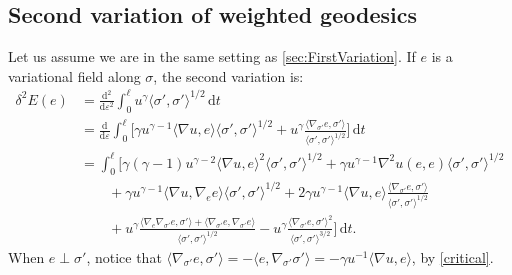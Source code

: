 \documentclass[12pt,a4paper,reqno]{amsart}
\theoremstyle{definition}
\newcommand{\D}{\nabla}
\newcommand{\metric}[2]{\langle#1,#2\rangle}
\renewcommand{\epsilon}{\varepsilon}
\begin{document}
\subsection{Second variation of weighted geodesics}\label{sec:Secondvariation}
  Let us assume we are in the same setting as \cref{sec:FirstVariation}. If $e$ is a variational field along $\sigma$, the second variation is:
\begin{equation}\label{eqn:OriginalSecondVariation}
\begin{aligned}
    \delta^2E(e) &= \frac{\mathrm{d}^2}{\mathrm{d}\epsilon^2}\int_0^\ell u^\gamma\metric{\sigma'}{\sigma'}^{1/2}\,\mathrm{d}t \\
    &= \frac {\mathrm{d}}{\mathrm{d}\epsilon}\int_0^\ell\Big[\gamma u^{\gamma-1}\metric{\D u}{e}\metric{\sigma'}{\sigma'}^{1/2}+u^\gamma\frac{\metric{\nabla_{\sigma'}e}{\sigma'}}{\metric{\sigma'}{\sigma'}^{1/2}}\Big]\,\mathrm{d}t \\
    &= \int_0^\ell\Big[\gamma(\gamma-1)u^{\gamma-2}\metric{\D u}{e}^2\metric{\sigma'}{\sigma'}^{1/2}+\gamma u^{\gamma-1}\D^2 u(e,e)\metric{\sigma'}{\sigma'}^{1/2} \\
    &\qquad +\gamma u^{\gamma-1}\metric{\D u}{\D_ee}\metric{\sigma'}{\sigma'}^{1/2}+{2\gamma u^{\gamma-1}\metric{\D u}{e}\frac{\metric{\nabla_{\sigma'}e}{\sigma'}}{\metric{\sigma'}{\sigma'}^{1/2}}} \\
    &\qquad +u^\gamma\frac{\metric{\D_e\D_{\sigma'}e}{\sigma'}+\metric{\nabla_{\sigma'}e}{\nabla_{\sigma'}e}}{\metric{\sigma'}{\sigma'}^{1/2}}-u^\gamma\frac{\metric{\nabla_{\sigma'}e}{\sigma'}^2}{\metric{\sigma'}{\sigma'}^{3/2}}\Big]\,\mathrm{d}t.
\end{aligned}
\end{equation}
When $e\perp\sigma'$, notice that $\metric{\nabla_{\sigma'}e}{\sigma'}=-\metric{e}{\D_{\sigma'}\sigma'}=-\gamma u^{-1}\metric{\D u}{e}$, by \eqref{critical}.
\end{document}
